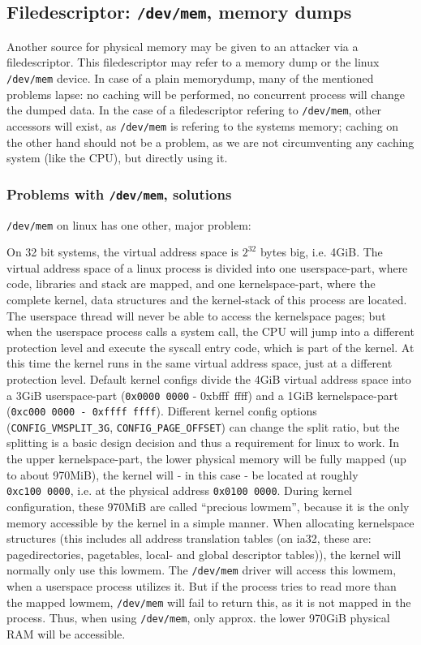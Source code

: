 \subsection{Filedescriptor: \texttt{/dev/mem}, memory dumps}

Another source for physical memory may be given to an attacker via a
filedescriptor. This filedescriptor may refer to a memory dump or the linux
\texttt{/dev/mem} device. In case of a plain memorydump, many of the mentioned
problems lapse: no caching will be performed, no concurrent process will change
the dumped data. In the case of a filedescriptor refering to \texttt{/dev/mem},
other accessors will exist, as \texttt{/dev/mem} is refering to the systems
memory; caching on the other hand should not be a problem, as we are not
circumventing any caching system (like the CPU), but directly using it.

\subsubsection{Problems with \texttt{/dev/mem}, solutions}

\texttt{/dev/mem} on linux has one other, major problem:

On 32 bit systems, the virtual address space is $2^{32}$ bytes big, i.e. 4GiB.
The virtual address space of a linux process is divided into one userspace-part,
where code, libraries and stack are mapped, and one kernelspace-part, where the
complete kernel, data structures and the kernel-stack of this process are
located. The userspace thread will never be able to access the kernelspace
pages; but when the userspace process calls a system call, the CPU will jump
into a different protection level and execute the syscall entry code, which is
part of the kernel. At this time the kernel runs in the same virtual address
space, just at a different protection level. Default kernel configs divide the
4GiB virtual address space into a 3GiB userspace-part (\texttt{0x0000~0000} -
{0xbfff~ffff}) and a 1GiB kernelspace-part (\texttt{0xc000~0000 - 0xffff~ffff}).
Different kernel config options (\texttt{CONFIG\_VMSPLIT\_3G},
\texttt{CONFIG\_PAGE\_OFFSET}) can change the split ratio, but the splitting is
a basic design decision and thus a requirement for linux to work. In the upper
kernelspace-part, the lower physical memory will be fully mapped (up to about
970MiB), the kernel will - in this case - be located at roughly
\texttt{0xc100~0000}, i.e. at the physical address \texttt{0x0100~0000}. During
kernel configuration, these 970MiB are called ``precious lowmem'', because it is
the only memory accessible by the kernel in a simple manner. When allocating
kernelspace structures (this includes all address translation tables (on ia32,
these are: pagedirectories, pagetables, local- and global descriptor
tables)\label{linuxATTinlowmem}), the kernel will normally only use this lowmem.
The \texttt{/dev/mem} driver will access this lowmem, when a userspace process
utilizes it. But if the process tries to read more than the mapped lowmem,
\texttt{/dev/mem} will fail to return this, as it is not mapped in the process.
Thus, when using \texttt{/dev/mem}, only approx.  the lower 970GiB physical RAM
will be accessible.

